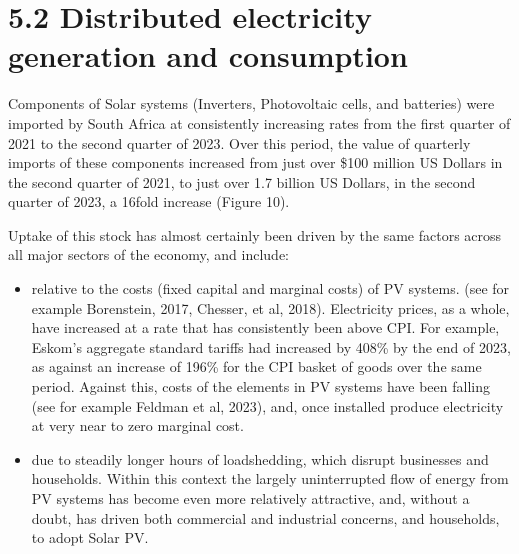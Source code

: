 \documentclass[letterpaper,10pt,english]{jupyterBook}
\begin{document}
\section{5.2 Distributed electricity generation and consumption}
\label{\detokenize{05Crosscuttingindustries:distributed-electricity-generation-and-consumption}}
\sphinxAtStartPar
{} Components of Solar systems (Inverters, Photovoltaic cells, and batteries) were imported by South Africa at consistently increasing rates from the first quarter of 2021 to the second quarter of 2023. Over this period, the value of quarterly imports of these components increased from just over \$100 million US Dollars in the second quarter of 2021, to just over 1.7 billion US Dollars, in the second quarter of 2023, a 16\sphinxhyphen{}fold increase (Figure 10).

\sphinxAtStartPar
{}

\sphinxAtStartPar
Uptake of this stock has almost certainly been driven by the same factors across all major sectors of the economy, and include:
\begin{itemize}
\item {} 
\sphinxAtStartPar
{} relative to the costs (fixed capital and marginal costs) of PV systems. (see for example Borenstein, 2017, Chesser, et al, 2018). Electricity prices, as a whole, have increased at a rate that has consistently been above CPI. For example, Eskom’s aggregate standard tariffs had increased by 408\% by the end of 2023, as against an increase of 196\% for the CPI basket of goods over the same period. Against this, costs of the elements in PV systems have been falling (see for example Feldman et al, 2023), and, once installed produce electricity at very near to zero marginal cost.

\item {} 
\sphinxAtStartPar
{} due to steadily longer hours of loadshedding, which disrupt businesses and households. Within this context the largely uninterrupted flow of energy from PV systems has become even more relatively attractive, and, without a doubt, has driven both commercial and industrial concerns, and households, to adopt Solar PV.

\end{itemize}
\end{document}
